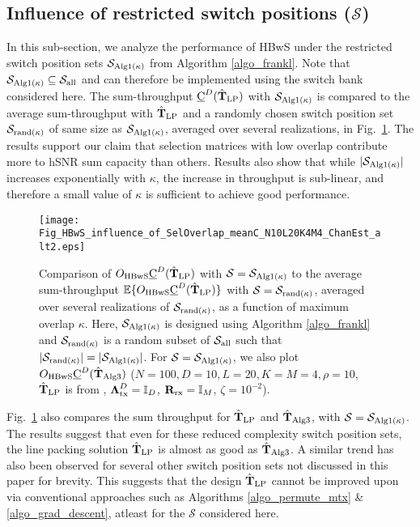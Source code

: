 \documentclass[journal,comsoc]{IEEEtran}
\begin{document}
\subsection{Influence of restricted switch positions ($\mathcal{S}$)}
In this sub-section, we analyze the performance of HBwS under the restricted switch position sets $\mathcal{S}_{\rm Alg1(\kappa)}$ from Algorithm \ref{algo_frankl}. Note that $\mathcal{S}_{\rm Alg1(\kappa)} \subseteq \mathcal{S}_{\rm all}$ and can therefore be implemented using the switch bank considered here. The sum-throughput $\underbar{C}^D(\hat{\mathbf{T}}_{\rm LP})$ with $\mathcal{S}_{\rm Alg1(\kappa)}$ is compared to the average sum-throughput with $\hat{\mathbf{T}}_{\rm LP}$ and a randomly chosen switch position set $\mathcal{S}_{\rm rand(\kappa)}$ of same size as $\mathcal{S}_{\rm Alg1(\kappa)}$, averaged over several realizations, in Fig.~\ref{fig_compare_overlapM}. The results support our claim that selection matrices with low overlap contribute more to hSNR sum capacity than others. Results also show that while $|\mathcal{S}_{\rm Alg1(\kappa)}|$ increases exponentially with $\kappa$, the increase in throughput is sub-linear, and therefore a small value of $\kappa$ is sufficient to achieve good performance. 
%
\begin{figure}[!h]
\centering
\texttt{[image: Fig\_HBwS\_influence\_of\_SelOverlap\_meanC\_N10L20K4M4\_ChanEst\_alt2.eps]}
\caption{Comparison of $O_{\rm HBwS}\underbar{C}^D(\hat{\mathbf{T}}_{\rm LP})$ with $\mathcal{S} = \mathcal{S}_{\rm Alg1(\kappa)}$ to the average sum-throughput $\mathbb{E}\{O_{\rm HBwS}\underbar{C}^D(\hat{\mathbf{T}}_{\rm LP})\}$ with $\mathcal{S} = \mathcal{S}_{\rm rand(\kappa)}$, averaged over several realizations of $\mathcal{S}_{\rm rand(\kappa)}$, as a function of maximum overlap $\kappa$. Here, $\mathcal{S}_{{\rm Alg1}(\kappa)}$ is designed using Algorithm \ref{algo_frankl} and $\mathcal{S}_{\rm rand(\kappa)}$ is a random subset of $\mathcal{S}_{\rm all}$ such that $|\mathcal{S}_{\rm rand(\kappa)}| = |\mathcal{S}_{\rm Alg1(\kappa)}|$. For $\mathcal{S} = \mathcal{S}_{\rm Alg1(\kappa)}$, we also plot $O_{\rm HBwS}\underbar{C}^D(\hat{\mathbf{T}}_{\rm Alg3})$ \big($N=100,D=10,L=20,K=M=4,\rho=10$, $\hat{\mathbf{T}}_{\rm LP}$ is from \cite{MedraRepository}, $\boldsymbol{\Lambda}^{D}_{\rm tx} = \mathbb{I}_D$, $\mathbf{R}_{\rm rx} = \mathbb{I}_M$, $\zeta = 10^{-2}$\big).}
\label{fig_compare_overlapM}
\end{figure}
%
Fig.~\ref{fig_compare_overlapM} also compares the sum throughput for $\hat{\mathbf{T}}_{\rm LP}$ and $\hat{\mathbf{T}}_{\rm Alg3}$, with $\mathcal{S}=\mathcal{S}_{\rm Alg1(\kappa)}$. The results suggest that even for these reduced complexity switch position sets, the line packing solution $\hat{\mathbf{T}}_{\rm LP}$ is almost as good as $\hat{\mathbf{T}}_{\rm Alg3}$. A similar trend has also been observed for several other switch position sets not discussed in this paper for brevity. This suggests that the design $\hat{\mathbf{T}}_{\rm LP}$ cannot be improved upon via conventional approaches such as Algorithms \ref{algo_permute_mtx} \& \ref{algo_grad_descent}, atleast for the $\mathcal{S}$ considered here.
\end{document}
